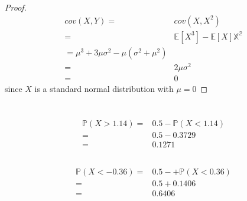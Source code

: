 \documentclass{article}
\begin{document}
    \section{}
        \begin{proof}
            \begin{equation*}
                \begin{split}
                    cov(X,Y)=&cov(X,X^2)\\
                        =&\mathbb{E}[X^3]-\mathbb{E}[X]\mathbb{X^2}\\
                        =\mu^3+3\mu\sigma^2-\mu(\sigma^2+\mu^2)\\
                        =&2\mu\sigma^2\\
                        =&0
                \end{split}
            \end{equation*}
        since $X$ is a standard normal distribution with $\mu=0$
        \end{proof}

    \section{}
        \subsection{}
            \begin{equation*}
                \begin{split}
                    \mathbb{P}(X>1.14)=&0.5-\mathbb{P}(X<1.14)\\
                        =&0.5-0.3729\\
                        =&0.1271
                \end{split}
            \end{equation*}
        \subsection{}
            \begin{equation*}
                \begin{split}
                    \mathbb{P}(X<-0.36)=&0.5-+\mathbb{P}(X<0.36)\\
                        =&0.5+0.1406\\
                        =&0.6406
                \end{split}
            \end{equation*}
\end{document}
